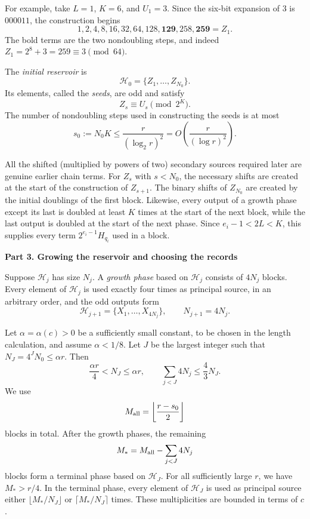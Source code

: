 \documentclass{article}
\theoremstyle{definition}
\begin{document}
For example, take $L=1$, $K=6$, and $U_1=3$.  Since the six-bit expansion of
$3$ is $000011$, the construction begins
$$
 1,2,4,8,16,32,64,128,\mathbf{129},258,\mathbf{259}=Z_1.
$$
The bold terms are the two nondoubling steps, and indeed
$Z_1=2^8+3=259\equiv3\pmod {64}$.

The \emph{initial reservoir} is
$$
 \mathcal H_0=\{Z_1,\ldots,Z_{N_0}\}.
$$
Its elements, called the \emph{seeds}, are odd and satisfy
\begin{equation}
 Z_s\equiv U_s\pmod {2^K}.
 \label{eq:F-new-seed-residues}
\end{equation}
The number of nondoubling steps used in constructing the seeds is at most
\begin{equation}
s_0:=N_0K\le\frac{r}{(\log_2r)^2}
=O\left(\frac{r}{(\log r)^2}\right).
\label{eq:F-new-seed-cost}
\end{equation}

All the shifted (multiplied by powers of two) secondary sources required later are genuine earlier chain
terms.  For $Z_s$ with $s<N_0$, the necessary shifts are created at the start
of the construction of $Z_{s+1}$.  The binary shifts of $Z_{N_0}$ are created by the
initial doublings of the first block.  Likewise, every output of a growth
phase except its last is doubled at least $K$ times at the start of the next
block, while the last output is doubled at the start of the next phase.  Since
$e_i-1<2L<K$, this supplies every term $2^{e_i-1}H_{q_i}$ used in a block.

\vskip 10pt

\noindent
{\bf Part 3. Growing the reservoir and choosing the records}

Suppose $\mathcal H_j$ has size $N_j$.  A \emph{growth phase} based on
$\mathcal H_j$ consists of $4N_j$ blocks.  Every element of $\mathcal H_j$ is
used exactly four times as principal source, in an arbitrary order, and the
odd outputs form
$$
 \mathcal H_{j+1}=\{X_1,\ldots,X_{4N_j}\},
 \qquad
 N_{j+1}=4N_j.
$$

Let $\alpha=\alpha(c)>0$ be a sufficiently small constant, to be chosen in
the length calculation, and assume $\alpha<1/8$.  Let $J$ be the largest integer such
that
$
 N_J=4^JN_0\leq\alpha r.
$
Then
\begin{equation}
 \frac{\alpha r}{4}<N_J\leq\alpha r,
 \qquad
 \sum_{j<J}4N_j\leq\frac43N_J.
 \label{eq:F-new-reservoir-sums}
\end{equation}
We use
\begin{equation}
 M_{\rm all}=\left\lfloor\frac{r-s_0}{2}\right\rfloor
 \label{eq:F-new-total-blocks}
\end{equation}
blocks in total.  After the growth phases, the remaining
$$
 M_*=M_{\rm all}-\sum_{j<J}4N_j
$$
blocks form a terminal phase based on $\mathcal H_J$.  For all sufficiently
large $r$, we have $M_*>r/4$.  In the terminal phase, every element of
$\mathcal H_J$ is used as principal source either
$\lfloor M_*/N_J\rfloor$ or $\lceil M_*/N_J\rceil$ times.  These
multiplicities are bounded in terms of $c$.
\end{document}
